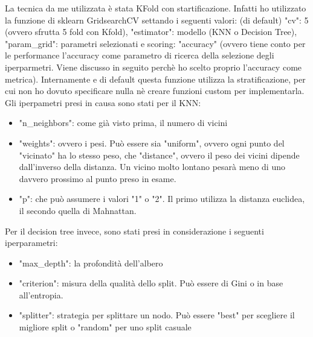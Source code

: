 La tecnica da me utilizzata è stata KFold con startificazione. Infatti ho utilizzato la funzione di sklearn GridsearchCV settando i seguenti valori: (di default) "cv": 5 (ovvero sfrutta 5 fold con Kfold), "estimator": modello (KNN o Decision Tree), "param\_grid": parametri selezionati e scoring: "accuracy" (ovvero tiene conto per le performance l'accuracy come parametro di ricerca della selezione degli iperparmetri. Viene discusso in seguito perchè ho scelto proprio l'accuracy come metrica).
Internamente e di default questa funzione utilizza la stratificazione, per cui non ho dovuto specificare nulla nè creare funzioni custom per implementarla.
\newline Gli iperpametri presi in causa sono stati per il KNN:
\begin{itemize}
    \item "n\_neighbors": come già visto prima, il numero di vicini
    \item "weights": ovvero i pesi. Può essere sia "uniform", ovvero ogni punto del "vicinato" ha lo stesso peso, che "distance", ovvero il peso dei vicini dipende dall'inverso della distanza. Un vicino molto lontano pesarà meno di uno davvero prossimo al punto preso in esame.
    \item "p": che può assumere i valori "1" o "2". Il primo utilizza la distanza euclidea, il secondo quella di Mahnattan.
\label{parameters}
\end{itemize}
\newline Per il decision tree invece, sono stati presi in considerazione i seguenti iperparametri:
\begin{itemize}
    \item "max\_depth": la profondità dell'albero
    \item "criterion": misura della qualità dello split. Può essere di Gini o in base all'entropia. 
    \item "splitter": strategia per splittare un nodo. Può essere "best" per scegliere il migliore split o "random" per uno split casuale
\end{itemize}


